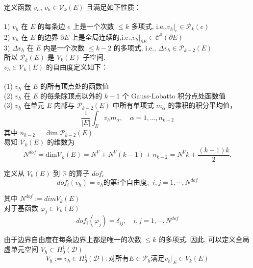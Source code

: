     定义函数 $v_h$, $v_h\in\mathcal V_k(E)$ 且满足如下性质：\\
    \\
    $1$) $v_h$ 在 $E$ 的每条边 $e$ 上是一个次数 $\le k$ 多项式, i.e.,$v_h|_e \in \mathcal P_k(e)$\\
    $2$) $v_h$ 在 $E$ 的边界 $\partial E$ 上是全局连续的,i.e.,$v_h|_{\partial E} \in \mathcal C^0(\partial E)$\\
    $3$) $\Delta v_h$ 在 $E$ 内是一个次数 $\le k - 2$ 的多项式, i.e., $\Delta v_h \in \mathcal P_{k-2}(E)$\\
    
    所以 $\mathcal{P}_k(E)$ 是 $V_k(E)$ 子空间. \\
    
    $v_h\in \mathcal V_k(E)$ 的自由度定义如下：\\
    \\
    (1) $v_h$ 在 $E$ 的所有顶点处的函数值\\
    (2) $v_h$ 在 $E$ 的每条除顶点以外的 $k-1$ 个 Gauss-Lobatto 积分点处函数值 \\ 
    (3) $v_h$ 在单元 $E$ 内部与 $\mathcal P_{k-2}(E)$ 中所有单项式 $m_\alpha$ 的乘积的积分平均值， $$ \frac{1}{|E|}\int_E v_h m_\alpha, \quad \alpha = 1, \ldots, n_{k-2}$$
    其中 $n_{k-2} = \dim \mathcal P_{k-2}(E)$\\
    
    易知 $\mathcal V_k(E)$ 的维数为 \\
    \begin{equation}
    N^{dof} = \text{dim} \mathcal V_k(E) = N^V + N^V(k - 1) + n_{k - 2} = N^Vk+ \frac{(k-1)k}{2}.
    \end{equation}
    
    定义从 $V_k(E)$ 到 $\mathbb{R}$ 的算子 $dof_i$ \\
    \begin{equation}
    dof_{i}(v_h) = v_h \text{的第} i \text{个自由度}, \,\ i,j = 1,\cdots, N^{dof} 
    \end{equation}
    
    其中 $N^{dof} := dimV_k(E)$ \\
    
    对于基函数 $\varphi_j \in V_k(E)$ \\
    \begin{equation}
    dof_{i}(\varphi_j) = \delta_{ij},\quad i,j = 1,\cdots,N^{dof} 
    \end{equation}
    
    由于边界自由度在每条边界上都是唯一的次数 $\le k$ 的多项式. 因此, 可以定义全局虚单元空间 $V_h \subset H_0^1(\mathcal D)$ \\
    \begin{equation*}
    V_h := {v_h \in H_0^1(\mathcal D) : \text{对所有} E\in\mathcal{P}_h \text{满足} v_h|_E \in V_k(E)}
    \end{equation*}
    
